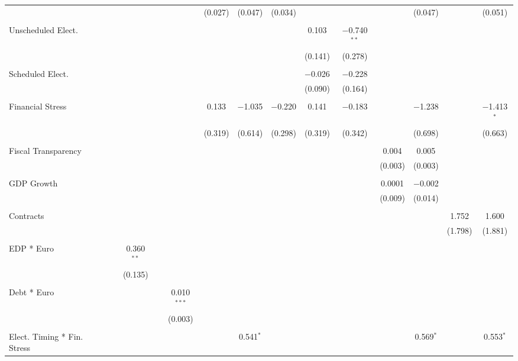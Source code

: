\begin{table}[!htbp]
\begin{tabular}{@{\extracolsep{5pt}}lccccccccccccc}
  &  &  &  &  & (0.027) & (0.047) & (0.034) &  &  &  & (0.047) &  & (0.051) \\ 
  & & & & & & & & & & & & & \\ 
 Unscheduled Elect. &  &  &  &  &  &  &  & 0.103 & $-$0.740$^{**}$ &  &  &  &  \\ 
  &  &  &  &  &  &  &  & (0.141) & (0.278) &  &  &  &  \\ 
  & & & & & & & & & & & & & \\ 
 Scheduled Elect. &  &  &  &  &  &  &  & $-$0.026 & $-$0.228 &  &  &  &  \\ 
  &  &  &  &  &  &  &  & (0.090) & (0.164) &  &  &  &  \\ 
  & & & & & & & & & & & & & \\ 
 Financial Stress &  &  &  &  & 0.133 & $-$1.035 & $-$0.220 & 0.141 & $-$0.183 &  & $-$1.238 &  & $-$1.413$^{*}$ \\ 
  &  &  &  &  & (0.319) & (0.614) & (0.298) & (0.319) & (0.342) &  & (0.698) &  & (0.663) \\ 
  & & & & & & & & & & & & & \\ 
 Fiscal Transparency &  &  &  &  &  &  &  &  &  & 0.004 & 0.005 &  &  \\ 
  &  &  &  &  &  &  &  &  &  & (0.003) & (0.003) &  &  \\ 
  & & & & & & & & & & & & & \\ 
 GDP Growth &  &  &  &  &  &  &  &  &  & 0.0001 & $-$0.002 &  &  \\ 
  &  &  &  &  &  &  &  &  &  & (0.009) & (0.014) &  &  \\ 
  & & & & & & & & & & & & & \\ 
 Contracts &  &  &  &  &  &  &  &  &  &  &  & 1.752 & 1.600 \\ 
  &  &  &  &  &  &  &  &  &  &  &  & (1.798) & (1.881) \\ 
  & & & & & & & & & & & & & \\ 
 EDP * Euro &  & 0.360$^{**}$ &  &  &  &  &  &  &  &  &  &  &  \\ 
  &  & (0.135) &  &  &  &  &  &  &  &  &  &  &  \\ 
  & & & & & & & & & & & & & \\ 
 Debt * Euro &  &  &  & 0.010$^{***}$ &  &  &  &  &  &  &  &  &  \\ 
  &  &  &  & (0.003) &  &  &  &  &  &  &  &  &  \\ 
  & & & & & & & & & & & & & \\ 
 Elect. Timing * Fin. Stress &  &  &  &  &  & 0.541$^{*}$ &  &  &  &  & 0.569$^{*}$ &  & 0.553$^{*}$ \\ 

\end{tabular}
\end{table}
